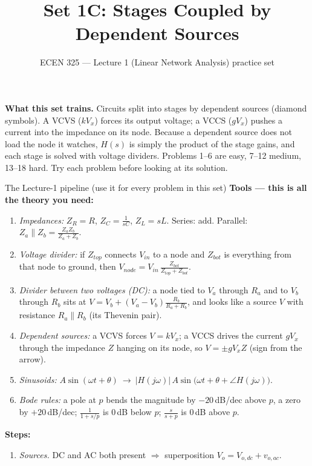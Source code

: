 \documentclass[11pt]{article}
\title{Set 1C: Stages Coupled by Dependent Sources}
\author{ECEN 325 --- Lecture 1 (Linear Network Analysis) practice set}
\date{}
\begin{document}
\maketitle

\textbf{What this set trains.} Circuits split into stages by dependent sources (diamond symbols). A VCVS
($kV_x$) forces its output voltage; a VCCS ($gV_x$) pushes a current into the impedance on its node. Because a
dependent source does not load the node it watches, $H(s)$ is simply the product of the stage gains, and each
stage is solved with voltage dividers. Problems 1--6 are easy, 7--12 medium, 13--18 hard. Try each problem
before looking at its solution.


\begin{cardbox}{The Lecture-1 pipeline (use it for every problem in this set)}
\textbf{Tools --- this is all the theory you need:}
\begin{enumerate}[label=\textbf{T\arabic*},leftmargin=2.2em,itemsep=1pt]
\item \emph{Impedances:} $Z_R=R$, $Z_C=\frac{1}{sC}$, $Z_L=sL$. Series: add. Parallel:
      $Z_a\parallel Z_b=\frac{Z_aZ_b}{Z_a+Z_b}$.
\item \emph{Voltage divider:} if $Z_{top}$ connects $V_{in}$ to a node and $Z_{bot}$ is everything from that
      node to ground, then $V_{node}=V_{in}\,\frac{Z_{bot}}{Z_{top}+Z_{bot}}$.
\item \emph{Divider between two voltages (DC):} a node tied to $V_a$ through $R_a$ and to $V_b$ through $R_b$ sits at
      $V=V_b+(V_a-V_b)\frac{R_b}{R_a+R_b}$, and looks like a source $V$ with resistance $R_a\parallel R_b$
      (its Thevenin pair).
\item \emph{Dependent sources:} a VCVS forces $V=kV_x$; a VCCS drives the current $gV_x$ through the impedance $Z$
      hanging on its node, so $V=\pm gV_x Z$ (sign from the arrow).
\item \emph{Sinusoids:} $A\sin(\omega t+\theta)\ \to\ |H(j\omega)|\,A\sin\big(\omega t+\theta+\angle H(j\omega)\big)$.
\item \emph{Bode rules:} a pole at $p$ bends the magnitude by $-20$\,dB/dec above $p$, a zero by $+20$\,dB/dec;
      $\frac{1}{1+s/p}$ is $0$\,dB below $p$; $\frac{s}{s+p}$ is $0$\,dB above $p$.
\end{enumerate}
\textbf{Steps:}
\begin{enumerate}[leftmargin=2.2em,itemsep=1pt]
\item \emph{Sources.} DC and AC both present $\Rightarrow$ superposition $V_o=V_{o,dc}+v_{o,ac}$.

\end{enumerate}
\end{cardbox}
\end{document}
